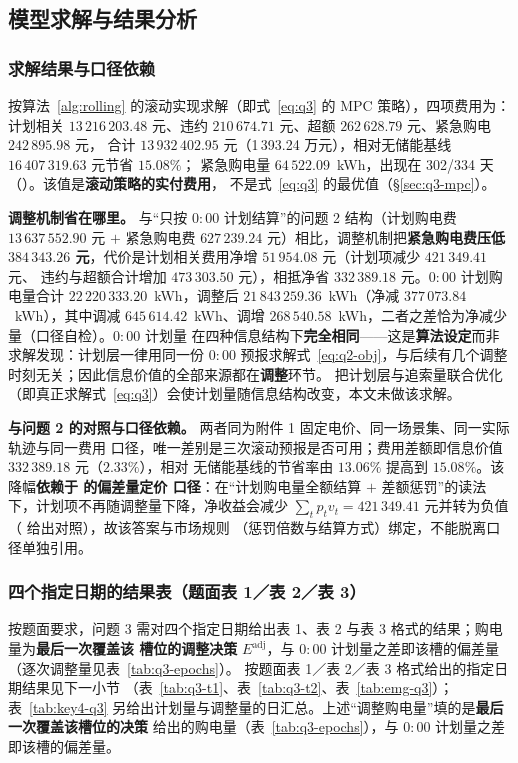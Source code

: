 \subsection{模型求解与结果分析}

\subsubsection{求解结果与口径依赖}

按算法~\ref{alg:rolling} 的滚动实现求解（即式~\eqref{eq:q3} 的 MPC 策略），四项费用为：计划相关
\(13\,216\,203.48\) 元、违约 \(210\,674.71\) 元、超额 \(262\,628.79\) 元、紧急购电 \(242\,895.98\) 元，
合计 \(13\,932\,402.95\) 元（1\,393.24 万元），相对无储能基线 \(16\,407\,319.63\) 元节省 \(15.08\%\)；
紧急购电量 \(64\,522.09\)~kWh，出现在 302/334 天（）。该值是\textbf{滚动策略的实付费用}，
不是式~\eqref{eq:q3} 的最优值（\S\ref{sec:q3-mpc}）。

\textbf{调整机制省在哪里。} 与“只按 \(0{:}00\) 计划结算”的问题 2 结构（计划购电费
\(13\,637\,552.90\) 元 \(+\) 紧急购电费 \(627\,239.24\) 元）相比，调整机制把\textbf{紧急购电费压低
\(384\,343.26\) 元}，代价是计划相关费用净增 \(51\,954.08\) 元（计划项减少 \(421\,349.41\) 元、
违约与超额合计增加 \(473\,303.50\) 元），相抵净省 \(332\,389.18\) 元。\(0{:}00\) 计划购电量合计
\(22\,220\,333.20\)~kWh，调整后 \(21\,843\,259.36\)~kWh（净减 \(377\,073.84\)~kWh），其中调减
\(645\,614.42\)~kWh、调增 \(268\,540.58\)~kWh，二者之差恰为净减少量（口径自检）。\(0{:}00\) 计划量
在四种信息结构下\textbf{完全相同}——这是\textbf{算法设定}而非求解发现：计划层一律用同一份 \(0{:}00\)
预报求解式~\eqref{eq:q2-obj}，与后续有几个调整时刻无关；因此信息价值的全部来源都在\textbf{调整}环节。
把计划层与追索量联合优化（即真正求解式~\eqref{eq:q3}）会使计划量随信息结构改变，本文未做该求解。

\textbf{与问题 2 的对照与口径依赖。} 两者同为附件 1 固定电价、同一场景集、同一实际轨迹与同一费用
口径，唯一差别是三次滚动预报是否可用；费用差额即信息价值 \(332\,389.18\) 元（\(2.33\%\)），相对
无储能基线的节省率由 \(13.06\%\) 提高到 \(15.08\%\)。该降幅\textbf{依赖于  的偏差量定价
口径}：在“计划购电量全额结算 \(+\) 差额惩罚”的读法下，计划项不再随调整量下降，净收益会减少
\(\sum_tp_tv_t=421\,349.41\) 元并转为负值（ 给出对照），故该答案与市场规则
（惩罚倍数与结算方式）绑定，不能脱离口径单独引用。

\subsubsection{四个指定日期的结果表（题面表 1／表 2／表 3）}
按题面要求，问题 3 需对四个指定日期给出表 1、表 2 与表 3 格式的结果；购电量为\textbf{最后一次覆盖该
槽位的调整决策} \(E^{\text{adj}}\)，与 \(0{:}00\) 计划量之差即该槽的偏差量（逐次调整量见表~\ref{tab:q3-epochs}）。
按题面表 1／表 2／表 3 格式给出的指定日期结果见下一小节
（表~\ref{tab:q3-t1}、表~\ref{tab:q3-t2}、表~\ref{tab:emg-q3}）；
表~\ref{tab:key4-q3} 另给出计划量与调整量的日汇总。上述“调整购电量”填的是\textbf{最后一次覆盖该槽位的决策}
给出的购电量（表~\ref{tab:q3-epochs}），与 \(0{:}00\) 计划量之差即该槽的偏差量。

